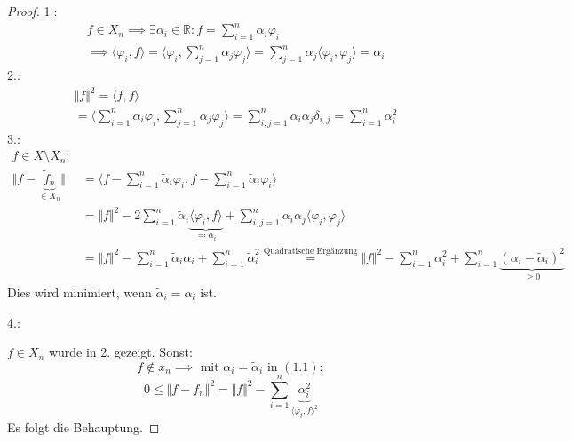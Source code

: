 \documentclass{book}
\def\R{\mathbb{R}}
\begin{document}
            \begin{proof}
                1.: 
                \begin{align*}
                    &f\in X_n\implies \exists \alpha_i\in \R: f=\sum_{i=1}^n\alpha_i\varphi_i\\
                    &\implies \langle \varphi_i,f \rangle= \langle \varphi_i, \sum_{j=1}^n\alpha_j\varphi_j\rangle
                    =\sum_{j=1}^n \alpha_j \langle \varphi_i,\varphi_j \rangle =\alpha_i
                \end{align*}
                2.:
                \begin{align*}
                    &\Vert f \Vert^2 = \langle f,f \rangle \\
                    &= \langle \sum_{i=1}^n \alpha_i \varphi_i, \sum_{j=1}^n \alpha_j \varphi_j \rangle =\sum_{i,j=1}^n\alpha_i\alpha_j\delta_{i,j}=\sum_{i=1}^n\alpha_i^2
                \end{align*}
                3.:
                \begin{align}
                    f\in X\setminus X_n:&\nonumber\\
                    \Vert f-\underbrace{\tilde{f}_n}_{\in X_n} \Vert &= \langle f-\sum_{i=1}^n\tilde{\alpha}_i\varphi_i,f-\sum_{i=1}^n\tilde{\alpha}_i\varphi_i \rangle\nonumber\\
                    &=\Vert f \Vert^2-2\sum_{i=1}^n\tilde{\alpha}_i \underbrace{\langle \varphi_i,f \rangle}_{\eqqcolon \alpha_i}+\sum_{i,j=1}^n\alpha_i\alpha_j \langle \varphi_i,\varphi_j \rangle \nonumber\\
                    &=\Vert f \Vert^2-\sum_{i=1}^n\tilde{\alpha}_i\alpha_i+\sum_{i=1}^n\tilde{\alpha}_i^2
                    \stackrel{\text{Quadratische Ergänzung}}{=} \Vert f \Vert^2-\sum_{i=1}^n\alpha_i^2+\sum_{i=1}^n\underbrace{(\alpha_i-\tilde{\alpha}_i)^2}_{\geq 0}
                \end{align}
                Dies wird minimiert, wenn $\tilde{\alpha}_i=\alpha_i$ ist.
                
                4.:

                $f\in X_n$ wurde in 2. gezeigt. Sonst:
                \begin{equation*}
                    f\notin x_n\implies \text{ mit } \alpha_i=\tilde{\alpha}_i \text{ in } (1.1):
                \end{equation*}
                \begin{equation*}
                    0\leq \Vert f-f_n \Vert^2=\Vert f \Vert^2-\sum_{i=1}^n\underbrace{\alpha_i^2}_{\langle \varphi_i,f \rangle^2}
                \end{equation*}
                Es folgt die Behauptung.
            \end{proof}
\end{document}

